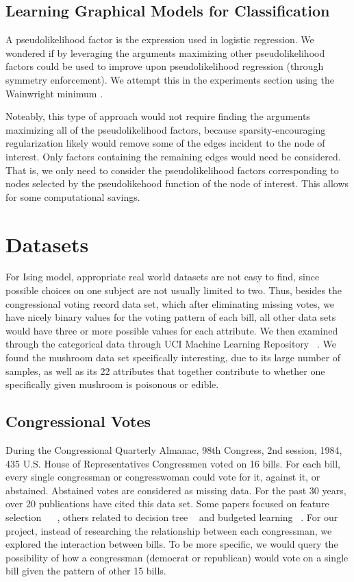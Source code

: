 \documentclass[11pt]{article}
\begin{document}
\subsection{Learning Graphical Models for Classification}
A pseudolikelihood factor is the expression used in logistic regression. We wondered if by leveraging the arguments maximizing other pseudolikelihood factors could be used to improve upon pseudolikelihood regression (through symmetry enforcement). We attempt this in the experiments section using the Wainwright minimum \cite{hoffling2009estimation}. 

Noteably, this type of approach would not require finding the arguments maximizing all of the pseudolikelihood factors, because sparsity-encouraging regularization likely would remove some of the edges incident to the node of interest. Only factors containing the remaining edges would need be considered. That is, we only need to consider the pseudolikelihood factors corresponding to nodes selected by the pseudolikehood function of the node of interest. This allows for some computational savings.

\section{Datasets}

For Ising model, appropriate real world datasets are not easy to find, since possible choices on one subject are not usually limited to two. Thus, besides the congressional voting record data set, which after eliminating missing votes, we have nicely binary values for the voting pattern of each bill, all other data sets would have three or more possible values for each attribute. We then examined through the categorical data through UCI Machine Learning Repository ~\cite{Dua:2017}. We found the mushroom data set specifically interesting, due to its large number of samples, as well as its 22 attributes that together contribute to whether one specifically given mushroom is poisonous or edible.

\subsection{Congressional Votes}

During the Congressional Quarterly Almanac, 98th Congress, 2nd session, 1984, 435 U.S. House of Representatives Congressmen voted on 16 bills. For each bill, every single congressman or congresswoman could vote for it, against it, or abstained. Abstained votes are considered as missing data. For the past 30 years, over 20 publications have cited this data set. Some papers focused on feature selection ~\cite{Chun1999ANNigma} ~\cite{Huan1998Inc}, others related to decision tree ~\cite{Erin1995Fea} and budgeted learning ~\cite{Dan2012Bud}. For our project, instead of researching the relationship between each congressman, we explored the interaction between bills. To be more specific, we would query the possibility of how a congressman (democrat or republican) would vote on a single bill given the pattern of other 15 bills.
\end{document}

